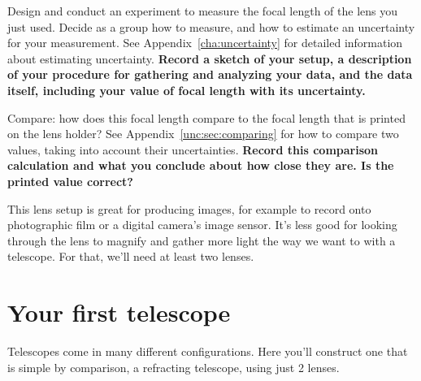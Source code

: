 \begin{steps}
	\item Design and conduct an experiment to measure the focal length of the lens you just used. Decide as a group how to measure, and how to estimate an uncertainty for your measurement. See Appendix\ \ref{cha:uncertainty} for detailed information about estimating uncertainty. \textbf{Record a sketch of your setup, a description of your procedure for gathering and analyzing your data, and the data itself, including your value of focal length with its uncertainty.}

	\item Compare: how does this focal length compare to the focal length that is printed on the lens holder? See Appendix\ \ref{unc:sec:comparing} for how to compare two values, taking into account their uncertainties. \textbf{Record this comparison calculation and what you conclude about how close they are. Is the printed value correct?}
\end{steps}

This lens setup is great for producing images, for example to record onto photographic film or a digital camera's image sensor. It's less good for looking through the lens to magnify and gather more light the way we want to with a telescope. For that, we'll need at least two lenses.

\section{Your first telescope}

Telescopes come in many different configurations. Here you'll construct one that is simple by comparison, a refracting telescope, using just 2 lenses.

